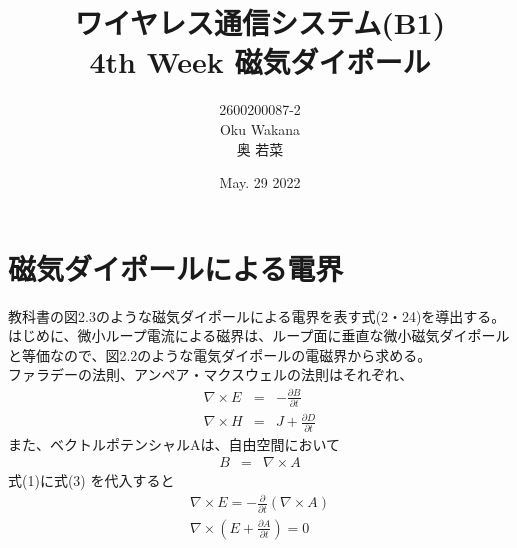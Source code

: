 \documentclass[dvipdfmx,autodetect-engine,titlepage]{jsarticle}
\title{ワイヤレス通信システム(B1)\\
4th Week 磁気ダイポール\\
}
\author{2600200087-2\\Oku Wakana\\奥 若菜}
\date{May. 29 2022}
\begin{document}
\maketitle

\section{磁気ダイポールによる電界}
教科書の図2.3のような磁気ダイポールによる電界を表す式(2・24)を導出する。\\
はじめに、微小ループ電流による磁界は、ループ面に垂直な微小磁気ダイポールと等価なので、図2.2のような電気ダイポールの電磁界から求める。\\

ファラデーの法則、アンペア・マクスウェルの法則はそれぞれ、
\begin{eqnarray}
  \nabla \times E &=& - \frac{\partial B}{\partial t}\\
  \nabla \times H &=& J + \frac{\partial D}{\partial t}
\end{eqnarray}
また、ベクトルポテンシャルAは、自由空間において
\begin{eqnarray}
  B &=& \nabla \times A 
\end{eqnarray}
式(1)に式(3) を代入すると
\begin{eqnarray}
  \nabla \times E = -\frac{\partial}{\partial t}(\nabla \times A)\nonumber\\
  \nabla \times (E+\frac{\partial A}{\partial t})= 0\nonumber
\end{eqnarray}
\end{document}
